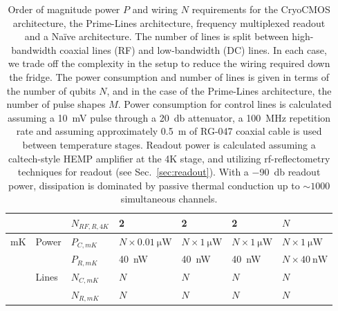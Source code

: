 {\begin{landscape}
\begin{table}
\begin{tabular}{|l|l|l|l|l|l|l|}
                        &                        & $N_{RF,R,4K}$ & 2                         & 2                        & 2   & $N$                 \\\hline
    \multirow{4}{*}{mK} & \multirow{2}{*}{Power} & $P_{C,mK}$ & $N\times\SI{0.01}{\micro\watt}$ & $ N\times\SI{1}{\micro\watt}$ & $N\times\SI{1}{\micro\watt}$   & $N\times\SI{1}{\micro\watt}$                   \\\cline{3-7}
                        &                        & $P_{R,mK}$ & \SI{40}{\nano\watt}     & \SI{40}{\nano\watt}           &\SI{40}{\nano\watt}   & $N\times\SI{40}{\nano\watt}$ \\\cline{2-7}
                        & \multirow{2}{*}{Lines} & $N_{C,mK}$ & $N$                     & $N$                           & $N$ & $N$                 \\\cline{3-7}
                        &                        & $N_{R,mK}$ & $N$                     & $N$                           & $N$ & $N$                 \\\hline
    \end{tabular}
    \caption[Approximate power and wiring requirements for a QC]{Order of magnitude power $P$ and wiring $N$ requirements for the CryoCMOS architecture, the Prime-Lines architecture, frequency multiplexed readout and a Na\"ive architecture. The number of lines is split between high-bandwidth coaxial lines (RF) and low-bandwidth (DC) lines. In each case, we trade off the complexity in the setup to reduce the wiring required down the fridge. The power consumption and number of lines is given in terms of the number of qubits $N$, and in the case of the Prime-Lines architecture, the number of pulse shapes $M$. Power consumption for control lines is calculated assuming a \SI{10}{\milli\volt} pulse through a \SI{20}{\decibel} attenuator, a \SI{100}{\mega\hertz} repetition rate and assuming approximately \SI{0.5}{\meter} of RG-047 coaxial cable is used between temperature stages. Readout power is calculated assuming a caltech-style HEMP amplifier at the 4K stage, and utilizing rf-reflectometry techniques for readout (see Sec.~\ref{sec:readout}). With a \SI{-90}{\decibel} readout power,
    dissipation is dominated by passive thermal conduction up to $\sim 1000$ simultaneous channels.}
    \label{tab:arch}
  \end{table}
\end{landscape}
}

